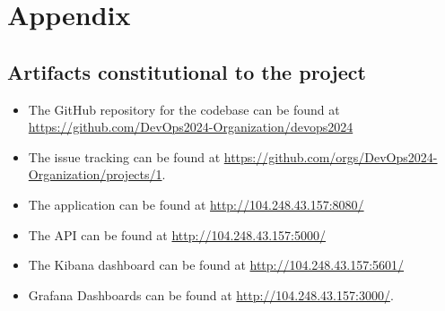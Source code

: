 \documentclass[12pt, a4paper, oneside]{book}
\begin{document}
{\raggedright


}

\appendix

\chapter{Appendix}\label{app}
\section{Artifacts constitutional to the project}

\begin{itemize}
    \item The GitHub repository for the codebase can be found at \href{https://github.com/DevOps2024-Organization/devops2024}{https://github.com/DevOps2024-Organization/devops2024}
    \item The issue tracking can be found at
    \href{https://github.com/orgs/DevOps2024-Organization/projects/1}{https://github.com/orgs/DevOps2024-Organization/projects/1}.
    \item The application can be found at
    \href{http://104.248.43.157:8080/}{http://104.248.43.157:8080/}
    \item The API can be found at
    \href{http://104.248.43.157:5000/}{http://104.248.43.157:5000/}
    \item The Kibana dashboard can be found at
    \href{http://104.248.43.157:5601/}{http://104.248.43.157:5601/}
    \item Grafana Dashboards can be found at \href{http://104.248.43.157:3000/}{http://104.248.43.157:3000/}.
\end{itemize}
\end{document}
